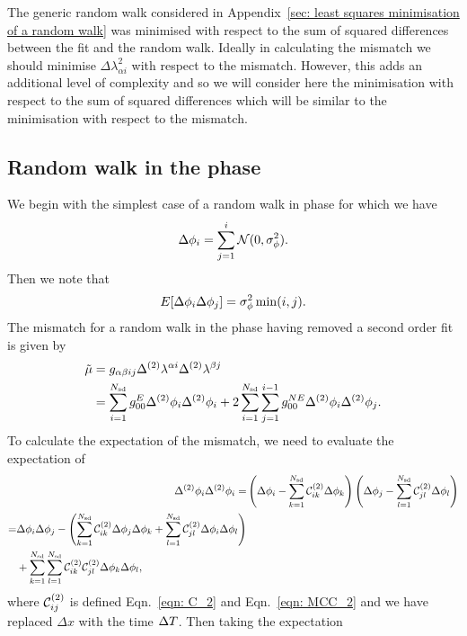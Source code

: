The generic random walk considered in Appendix~\ref{sec: least squares
minimisation of a random walk} was minimised with respect to the sum of squared
differences between the fit and the random walk. Ideally in calculating the
mismatch we should minimise $\Delta\lambda_{\alpha i}^{2}$ with respect to the
mismatch. However, this adds an additional level of complexity and so we will
consider here the minimisation with respect to the sum of squared differences
which will be similar to the minimisation with respect to the mismatch.

\subsection{Random walk in the phase}
We begin with the simplest case of a random walk in phase for which we have
\begin{equation}
\Delta\phi_{i} = \sum_{j=1}^{i}\mathcal{N}(0, \sigma_{\phi}^{2}).
\end{equation}
Then we note that
\begin{equation}
E[\Delta\phi_{i} \Delta\phi_{j}] = \sigma_{\phi}^{2} \min(i, j).
\end{equation}
The mismatch for a random walk in the phase having removed a second order
fit is given by
\begin{align}
\tilde{\mu} & = g_{\alpha \beta i j} \Delta^{(2)}\lambda^{\alpha i}\Delta^{(2)}\lambda^{\beta j} \\
& = \sum_{i=1}^{N_{\textrm{sd}}}g_{00}^{E} \Delta^{(2)}\phi_{i}\Delta^{(2)}\phi_{i}
+ 2 \sum_{i=1}^{N_{\textrm{sd}}}\sum_{j=1}^{i-1}g_{00}^{NE}\Delta^{(2)}\phi_{i}\Delta^{(2)}\phi_{j}.
\label{eqn: 4202540871}
\end{align}
To calculate the expectation of the mismatch, we need to evaluate the
expectation of
\begin{align}
\Delta^{(2)}\phi_{i}\Delta^{(2)}\phi_{i} = & \left(\Delta\phi_{i}
- \sum_{k=1}^{N_{\textrm{sd}}}\mathcal{C}^{(2)}_{ik}\Delta\phi_{k}\right)
 \left(\Delta\phi_{j} - \sum_{l=1}^{N_{\textrm{sd}}}\mathcal{C}^{(2)}_{jl}\Delta\phi_{l}\right) \\
\begin{split}
= & \Delta\phi_{i}\Delta\phi_{j} -
\left(\sum_{k=1}^{N_{\textrm{sd}}}\mathcal{C}^{(2)}_{ik} \Delta\phi_{j}\Delta\phi_{k}
+ \sum_{l=1}^{N_{\textrm{sd}}}\mathcal{C}^{(2)}_{jl}\Delta\phi_{i}\Delta\phi_{l}\right) \\
& +
\sum_{k=1}^{N_{\textrm{sd}}}\sum_{l=1}^{N_{\textrm{sd}}}\mathcal{C}^{(2)}_{ik}\mathcal{C}^{(2)}_{jl} \Delta\phi_{k}\Delta\phi_{l},
\end{split}
\end{align}
where $\mathcal{C}^{(2)}_{ij}$ is defined Eqn.~\ref{eqn: C_2} and Eqn.~\ref{eqn:  MCC_2}
and we have replaced $\Delta x$ with the time $\Delta T$. Then taking the expectation
